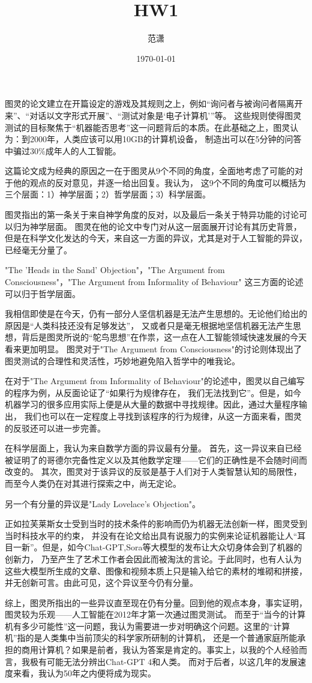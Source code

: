 \documentclass[a4paper]{article}
\title{HW1}
\author{范潇\quad 2254298}
\date{\today}
\begin{document}
\maketitle
图灵的论文建立在开篇设定的游戏及其规则之上，例如“询问者与被询问者隔离开来”、“对话以文字形式开展”、“测试对象是‘电子计算机’”等。
这些规则使得图灵测试的目标聚焦于“机器能否思考”这一问题背后的本质。在此基础之上，图灵认为：到2000年，人类应该可以用10GB的计算机设备，
制造出可以在5分钟的问答中骗过30\%成年人的人工智能。

这篇论文成为经典的原因之一在于图灵从9个不同的角度，全面地考虑了可能的对于他的观点的反对意见，并逐一给出回复。我认为，
这9个不同的角度可以概括为三个层面：1）神学层面；2）哲学层面；3）科学层面。
	
图灵指出的第一条关于来自神学角度的反对，以及最后一条关于特异功能的讨论可以归为神学层面。
图灵在他的论文中专门对从这一层面展开讨论有其历史背景，但是在科学文化发达的今天，来自这一方面的异议，尤其是对于人工智能的异议，已经毫无分量了。
	
"The 'Heads in the Sand' Objection"，"The Argument from Consciousness"，"The Argument from Informality of Behaviour"
这三方面的论述可以归于哲学层面。

我相信即使是在今天，仍有一部分人坚信机器是无法产生思想的。无论他们给出的原因是“人类科技还没有足够发达”，
又或者只是毫无根据地坚信机器无法产生思想，背后是图灵所说的“鸵鸟思想”在作祟，这一点在人工智能领域快速发展的今天看来更加明显。
图灵对于"The Argument from Consciousness"的讨论则体现出了图灵测试的合理性和灵活性，巧妙地避免陷入哲学中的唯我论。

在对于"The Argument from Informality of Behaviour"的论述中，图灵以自己编写的程序为例，从反面论证了“如果行为规律存在，
我们无法找到它”。但是，如今机器学习的很多应用实际上便是从大量的数据中寻找规律。因此，通过大量程序输出，
我们也可以在一定程度上寻找到该程序的行为规律，从这一方面来看，图灵的反驳还可以进一步完善。

在科学层面上，我认为来自数学方面的异议最有分量。
首先，这一异议来自已经被证明了的哥德尔完备性定义以及其他数学定理——它们的正确性是不会随时间而改变的。
其次，图灵对于该异议的反驳是基于人们对于人类智慧认知的局限性，而至今人类仍在对其进行探索之中，尚无定论。

另一个有分量的异议是"Lady Lovelace’s Objection"。

正如拉芙莱斯女士受到当时的技术条件的影响而仍为机器无法创新一样，图灵受到当时科技水平的约束，
并没有在论文给出具有说服力的实例来论证机器能让人“耳目一新”。但是，如今Chat-GPT,Sora等大模型的发布让大众切身体会到了机器的创新力，
乃至产生了艺术工作者会因此而被淘汰的言论。于此同时，也有人认为这些大模型所生成的文章、图像和视频本质上只是输入给它的素材的堆砌和拼接，
并无创新可言。由此可见，这个异议至今仍有分量。
	
综上，图灵所指出的一些异议直至现在仍有分量。回到他的观点本身，事实证明，图灵较为乐观——人工智能在2012年才第一次通过图灵测试。
而至于“当今的计算机有多少可能性”这一问题，我认为需要进一步对明确这个问题。这里的“计算机”指的是人类集中当前顶尖的科学家所研制的计算机，
还是一个普通家庭所能承担的商用计算机？如果是前者，我认为答案是肯定的。事实上，以我的个人经验而言，我极有可能无法分辨出Chat-GPT 4和人类。
而对于后者，以这几年的发展速度来看，我认为50年之内便将成为现实。
\end{document}
